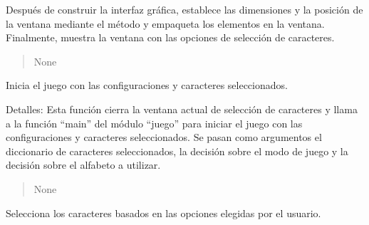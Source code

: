 \documentclass[letterpaper,10pt,spanish]{sphinxmanual}
\begin{document}
\begin{fulllineitems}
\begin{fulllineitems}
\sphinxAtStartPar
Después de construir la interfaz gráfica, establece las dimensiones y la posición de la ventana mediante el
método  y empaqueta los elementos en la ventana. Finalmente, muestra la ventana con las opciones de
selección de caracteres.
\begin{quote}\begin{description}
\sphinxAtStartPar
None

\end{description}\end{quote}

\end{fulllineitems}


\begin{fulllineitems}
\label{\detokenize{menu_juego:menu_juego.CaracteresSelector.iniciar_juego}}
\pysigstartsignatures
{}
\pysigstopsignatures
\sphinxAtStartPar
Inicia el juego con las configuraciones y caracteres seleccionados.

\sphinxAtStartPar
Detalles: Esta función cierra la ventana actual de selección de caracteres y llama a la función “main” del
módulo “juego” para iniciar el juego con las configuraciones y caracteres seleccionados. Se pasan como
argumentos el diccionario de caracteres seleccionados, la decisión sobre el modo de juego y la decisión sobre
el alfabeto a utilizar.
\begin{quote}\begin{description}
\sphinxAtStartPar
None

\end{description}\end{quote}

\end{fulllineitems}


\begin{fulllineitems}
\label{\detokenize{menu_juego:menu_juego.CaracteresSelector.seleccionar_caracteres}}
\pysigstartsignatures
{}
\pysigstopsignatures
\sphinxAtStartPar
Selecciona los caracteres basados en las opciones elegidas por el usuario.


\end{fulllineitems}
\end{fulllineitems}
\end{document}
